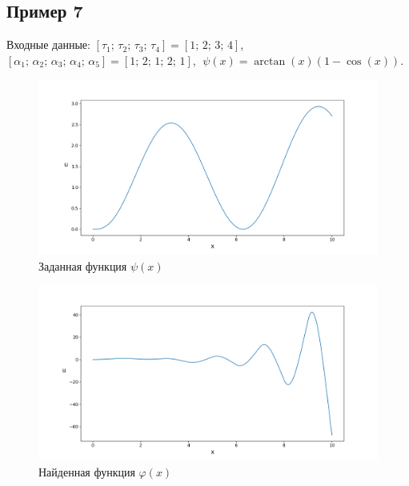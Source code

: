 \documentclass{article}
\theoremstyle{definition}
\begin{document}
\subsection{Пример 7}
Входные данные: 
$[\tau_1;\, \tau_2;\, \tau_3;\, \tau_4] = [1;\, 2;\, 3;\, 4]$, \\[1mm]
$[\alpha_1;\, \alpha_2;\, \alpha_3;\, \alpha_4;\, \alpha_5] = [1;\, 2;\, 1;\, 2;\, 1]$, 
$\;\psi(x) = \arctan(x)(1 - \cos(x))$.
\begin{figure}[H]
	\centering
	\includegraphics[trim={2.475cm, 0, 0, 1.5cm}, clip, scale=0.624]{56_psi.png}
	\caption{Заданная функция $\psi(x)$}
	\label{fig:image11}
\end{figure}

\begin{figure}[H]
	\centering
	\includegraphics[trim={2.175cm, 0, 0, 1.5cm}, clip, scale=0.618]{6_u0.png}
	\caption{Найденная функция $\varphi(x)$}
	\label{fig:image12}
\end{figure}

\newpage
\end{document}
